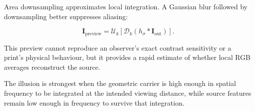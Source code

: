 Area downsampling approximates local integration. A Gaussian blur followed by downsampling better suppresses aliasing:

\begin{equation}
\mathbf{I}_{\mathrm{preview}}=
\mathcal{U}_k\left[
\mathcal{D}_k\left(h_{\sigma}*\mathbf{I}_{\mathrm{out}}\right)
\right].
\end{equation}

This preview cannot reproduce an observer's exact contrast sensitivity or a print's physical behaviour, but it provides a rapid estimate of whether local RGB averages reconstruct the source.

\begin{principlebox}
The illusion is strongest when the geometric carrier is high enough in spatial frequency to be integrated at the intended viewing distance, while source features remain low enough in frequency to survive that integration.
\end{principlebox}


